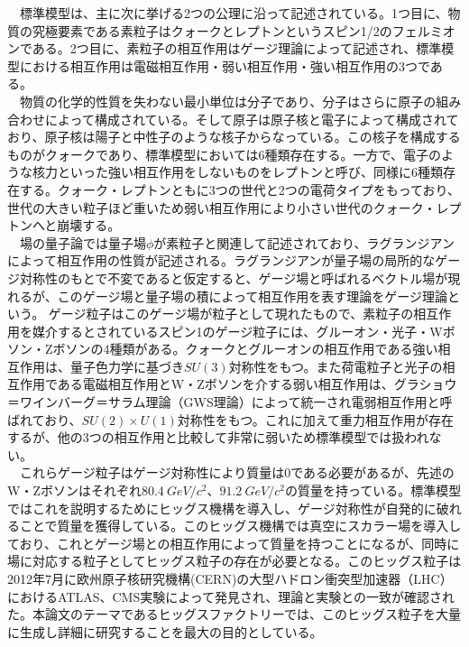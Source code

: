 　標準模型は、主に次に挙げる2つの公理に沿って記述されている。1つ目に、物質の究極要素である素粒子はクォークとレプトンというスピン1/2のフェルミオンである。2つ目に、素粒子の相互作用はゲージ理論によって記述され、標準模型における相互作用は電磁相互作用・弱い相互作用・強い相互作用の3つである。\\
　物質の化学的性質を失わない最小単位は分子であり、分子はさらに原子の組み合わせによって構成されている。そして原子は原子核と電子によって構成されており、原子核は陽子と中性子のような核子からなっている。この核子を構成するものがクォークであり、標準模型においては6種類存在する。一方で、電子のような核力といった強い相互作用をしないものをレプトンと呼び、同様に6種類存在する。クォーク・レプトンともに3つの世代と2つの電荷タイプをもっており、世代の大きい粒子ほど重いため弱い相互作用により小さい世代のクォーク・レプトンへと崩壊する。\\
　場の量子論では量子場$\phi$が素粒子と関連して記述されており、ラグランジアンによって相互作用の性質が記述される。ラグランジアンが量子場の局所的なゲージ対称性のもとで不変であると仮定すると、ゲージ場と呼ばれるベクトル場が現れるが、このゲージ場と量子場の積によって相互作用を表す理論をゲージ理論という。
ゲージ粒子はこのゲージ場が粒子として現れたもので、素粒子の相互作用を媒介するとされているスピン1のゲージ粒子には、グルーオン・光子・Wボソン・Zボソンの4種類がある。クォークとグルーオンの相互作用である強い相互作用は、量子色力学に基づき$SU(3)$対称性をもつ。また荷電粒子と光子の相互作用である電磁相互作用とW・Zボソンを介する弱い相互作用は、グラショウ＝ワインバーグ＝サラム理論（GWS理論）によって統一され電弱相互作用と呼ばれており、$SU(2)\times U(1)$対称性をもつ。これに加えて重力相互作用が存在するが、他の3つの相互作用と比較して非常に弱いため標準模型では扱われない。\\
　これらゲージ粒子はゲージ対称性により質量は0である必要があるが、先述のW・Zボソンはそれぞれ$80.4\ GeV/c^2$、$91.2\ GeV/c^2$の質量を持っている。標準模型ではこれを説明するためにヒッグス機構を導入し、ゲージ対称性が自発的に破れることで質量を獲得している。このヒッグス機構では真空にスカラー場を導入しており、これとゲージ場との相互作用によって質量を持つことになるが、同時に場に対応する粒子としてヒッグス粒子の存在が必要となる。このヒッグス粒子は2012年7月に欧州原子核研究機構(CERN)の大型ハドロン衝突型加速器（LHC）におけるATLAS、CMS実験によって発見され、理論と実験との一致が確認された。本論文のテーマであるヒッグスファクトリーでは、このヒッグス粒子を大量に生成し詳細に研究することを最大の目的としている。\\
